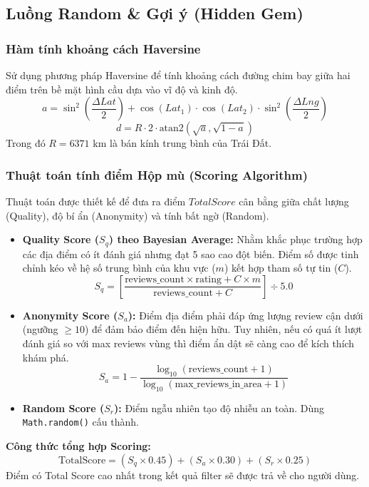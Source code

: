 \documentclass[12pt]{article}
\begin{document}
\subsection{Luồng Random \& Gợi ý (Hidden Gem)}
\subsubsection{Hàm tính khoảng cách Haversine}
Sử dụng phương pháp Haversine để tính khoảng cách đường chim bay giữa hai điểm trên bề mặt hình cầu dựa vào vĩ độ và kinh độ.
\begin{equation}
a = \sin^2\left(\frac{\Delta Lat}{2}\right) + \cos(Lat_1) \cdot \cos(Lat_2) \cdot \sin^2\left(\frac{\Delta Lng}{2}\right)
\end{equation}
\begin{equation}
d = R \cdot 2 \cdot \text{atan2}(\sqrt{a}, \sqrt{1-a})
\end{equation}
Trong đó $R = 6371$ km là bán kính trung bình của Trái Đất.

\subsubsection{Thuật toán tính điểm Hộp mù (Scoring Algorithm)}
Thuật toán được thiết kế để đưa ra điểm $TotalScore$ cân bằng giữa chất lượng (Quality), độ bí ẩn (Anonymity) và tính bất ngờ (Random).
\begin{itemize}
    \item \textbf{Quality Score ($S_q$) theo Bayesian Average:} Nhằm khắc phục trường hợp các địa điểm có ít đánh giá nhưng đạt 5 sao cao đột biến. Điểm số được tinh chỉnh kéo về hệ số trung bình của khu vực ($m$) kết hợp tham số tự tin ($C$).
    \begin{equation}
    S_q = \left[ \frac{\text{reviews\_count} \times \text{rating} + C \times m}{\text{reviews\_count} + C} \right] \div 5.0
    \end{equation}
    \item \textbf{Anonymity Score ($S_a$):} Điểm địa điểm phải đáp ứng lượng review cận dưới (ngưỡng $\ge 10$) để đảm bảo điểm đến hiện hữu. Tuy nhiên, nếu có quá ít lượt đánh giá so với max reviews vùng thì điểm ẩn dật sẽ càng cao để kích thích khám phá.
    \begin{equation}
    S_a = 1 - \frac{\log_{10}(\text{reviews\_count} + 1)}{\log_{10}(\text{max\_reviews\_in\_area} + 1)}
    \end{equation}
    \item \textbf{Random Score ($S_r$):} Điểm ngẫu nhiên tạo độ nhiễu an toàn. Dùng \texttt{Math.random()} cấu thành.
\end{itemize}
\textbf{Công thức tổng hợp Scoring:}
\begin{equation}
\text{TotalScore} = (S_q \times 0.45) + (S_a \times 0.30) + (S_r \times 0.25)
\end{equation}
Điểm có Total Score cao nhất trong kết quả filter sẽ được trả về cho người dùng.
\end{document}
